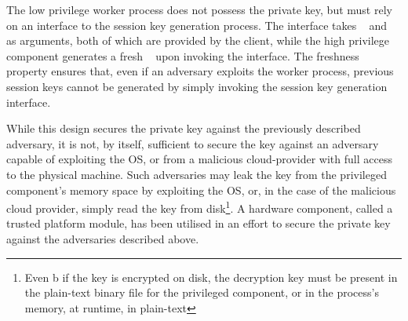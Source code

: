 \documentclass[../main.tex]{subfiles}
\begin{document}
The low privilege worker process does not possess the private key, but
must rely on an interface to the session key generation process. The
interface takes \crandom~ and \premaster~ as arguments, both of which
are provided by the client, while the high privilege component
generates a fresh \srandom~ upon invoking the interface. The freshness
property ensures that, even if an adversary exploits the worker
process, previous session keys cannot be generated by simply invoking
the session key generation interface.

While this design secures the private key against the previously
described adversary, it is not, by itself, sufficient to secure the
key against an adversary capable of exploiting the OS, or from a
malicious cloud-provider with full access to the physical
machine. Such adversaries may leak the key from the privileged
component's memory space by exploiting the OS, or, in the case of the
malicious cloud provider, simply read the key from disk\footnote{Even
b  if the key is encrypted on disk, the decryption key must be present
  in the plain-text binary file for the privileged component, or in
  the process's memory, at runtime, in plain-text}.  A hardware
component, called a trusted platform module, has been utilised in an
effort to secure the private key against the adversaries described
above.
\end{document}
